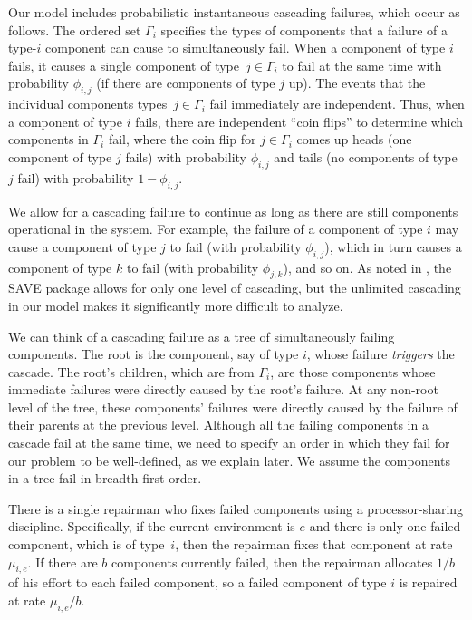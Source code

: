 \documentclass[12pt]{article}
\begin{document}
Our model includes probabilistic
instantaneous cascading failures,
which occur as follows.
The ordered set $\Gamma_i$ specifies
the types of components
that a failure of a type-$i$ component
can cause to simultaneously fail.
When a component of type $i$ fails,
it causes a single 
component of type~$j \in \Gamma_i$
to fail at the same time
with probability
$\phi_{i,j}$
(if there are components of type $j$ up).
The events that the individual components
types~$j \in \Gamma_i$
fail immediately are independent.
Thus, when a component of type $i$ fails,
there are independent ``coin flips''
to determine which components in $\Gamma_i$ fail,
where the coin flip for $j \in \Gamma_i$
comes up heads (one component of
type $j$ fails) with probability $\phi_{i,j}$
and tails
(no components of type $j$ fail)
with probability $1 - \phi_{i,j}$.

We allow for a cascading failure to continue
as long as there are still components operational
in the system.  For example, the failure of
a component of type $i$ may cause
a component of type $j$ to fail
(with probability $\phi_{i,j}$),
which in turn causes a component of type $k$
to fail (with probability $\phi_{j,k}$),
and so on.
As noted in \cite{ING:2009},
the SAVE package \cite{BHLNS:1994}
allows for only one level of cascading,
but the unlimited cascading in our model
makes it significantly more difficult
to analyze.

We can think of a cascading failure
as a tree of simultaneously failing components.
The root is the component, say of type $i$,
whose failure \textit{triggers} the cascade.
The root's children, which are from
$\Gamma_i$, are those components
whose immediate failures
were directly caused by the
root's failure.
At any non-root level of the tree, 
these components'
failures were directly caused by the
failure of their parents at the previous level.
Although all the failing components
in a cascade fail at the same time,
we need to specify an order in which
they fail for our problem to
be well-defined, as we explain later.
We assume the components in a tree
fail in breadth-first order.


There is a single repairman who
fixes failed components using
a processor-sharing discipline.
Specifically, if the current
environment is $e$ and there
is only one failed component,
which is of type~$i$, then
the repairman fixes that component
at rate $\mu_{i,e}$.
If there are $b$ components currently failed,
then the repairman allocates $1/b$ of
his effort to each failed component,
so a failed component of type $i$ is
repaired at rate $\mu_{i,e}/b$.
\end{document}
